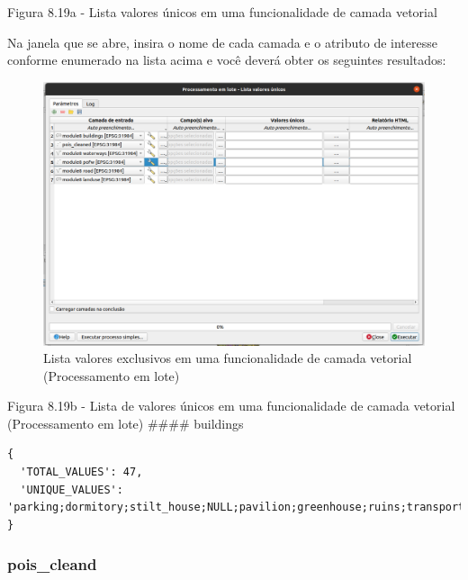 \documentclass[
  portuguese,
]{krantz}
\begin{document}
Figura 8.19a - Lista valores únicos em uma funcionalidade de camada vetorial

Na janela que se abre, insira o nome de cada camada e o atributo de interesse conforme enumerado na lista acima e você deverá obter os seguintes resultados:

\begin{figure}
\centering
\includegraphics{media/modulo8/fig819_b.png}
\caption{Lista valores exclusivos em uma funcionalidade de camada vetorial (Processamento em lote)}
\end{figure}

Figura 8.19b - Lista de valores únicos em uma funcionalidade de camada vetorial (Processamento em lote)
\#\#\#\# buildings

\begin{verbatim}
{
  'TOTAL_VALUES': 47,
  'UNIQUE_VALUES': 'parking;dormitory;stilt_house;NULL;pavilion;greenhouse;ruins;transportation;college;yes;chapel;boathouse;retail;supermarket;Prédio;college;industrial;farm;house;garages;garage;university;public;shed;roof;carport;church;temple;service;residential;hotel;warehouse;shop;cowshed;civic;kindergarten;stadium;apartments;semidetached_house;office;cabin;school;construction;commercial;terrace;grandstand;hospital;government'
}
\end{verbatim}

\hypertarget{pois_cleand}{%
\subsubsection{pois\_cleand}\label{pois_cleand}}
\end{document}
